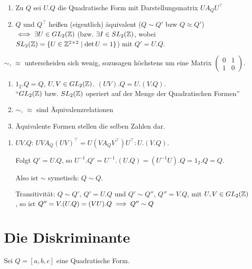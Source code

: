 \documentclass[a4paper,twoside,DIV15,BCOR12mm]{scrbook}
\begin{document}
\begin{definition}
\begin{enumerate}
\item Zu $Q$ sei $U.Q$ die Quadratische Form mit Darstellungsmatrix $UA_QU^\top$
\item $Q$ und $Q^\top$ heißen (eigentlich) äquivalent ($Q \sim Q'$ bzw $Q \approx Q'$) $\iff \exists U\in GL_2(\mathbb{Z})$ (bzw. $\exists I \in SL_2(\mathbb{Z})$, wobei $SL_2(\mathbb{Z}) = \{ U\in\mathbb{Z}^{2\times 2}\mid \det U = 1\}$) mit $Q' = U.Q$.
\end{enumerate}
\end{definition}

$\sim$, $\approx$ unterscheiden sich wenig, sozusagen höchstens um eine Matrix $\begin{pmatrix} 0 & 1 \\ 1 & 0\end{pmatrix}$.

\begin{bemerkung}
\begin{enumerate}
\item $1_2.Q = Q$, $U,V \in GL_2(\mathbb{Z})$. $(UV).Q = U.(V.Q)$.\\
"`$GL_2(\mathbb{Z})$ bzw. $SL_2(\mathbb{Z})$ operiert auf der Menge der Quadratischen Formen"'
\item $\sim$, $\approx$ sind Äquivalenzrelationen
\item Äquivalente Formen stellen die selben Zahlen dar.
\end{enumerate}
\end{bemerkung}

\begin{beweis}
\begin{enumerate}
\item $UV.Q$: $UVA_Q(UV)^\top = U(VA_QV^\top)U^\top: U.(V.Q)$.

Folgt $Q'=U.Q$, so $U^{-1}.Q' = U^{-1}.(U.Q)=(U^{-1}U).Q = 1_2. Q =Q$.

Also ist $\sim$ symetisch: $Q\sim Q$.

Transitivität: $Q\sim Q'$, $Q'=U.Q$ und $Q'\sim Q''$, $Q'' = V.Q$, mit $U,V\in GL_2(\mathbb{Z})$, so ist $Q''=V.(U.Q)=(VU).Q \implies Q''\sim Q$
\end{enumerate}
\end{beweis}

\section{Die Diskriminante}

Sei $Q=[a,b,c]$ eine Quadratische Form.
\end{document}

